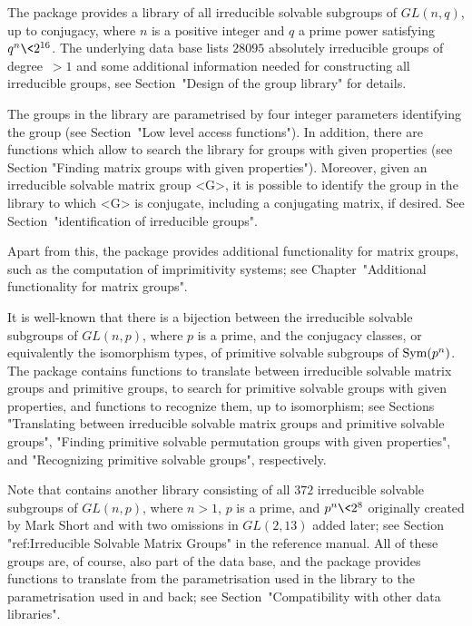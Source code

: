 
The package {\IRREDSOL} provides a library of all irreducible
solvable subgroups of $GL(n, q)$, up to conjugacy, where $n$ is a positive integer and $q$
a prime power satisfying  $q^n \< 2^{16}$. The underlying data base lists 
$28095$ absolutely irreducible groups of degree~$> 1$ and some additional information
needed for constructing all irreducible groups, see Section~"Design of the group library"
for details.

The groups in the {\IRREDSOL} 
library are parametrised by four integer parameters identifying
the group (see Section~"Low
level access functions"). In addition, there are functions which allow to 
search the library for groups with given properties (see Section "Finding
matrix groups with given properties"). Moreover, given an irreducible solvable matrix group
<G>, it is possible to identify the group in the library to which <G> is conjugate,
including a conjugating matrix, if desired. See Section~"identification of irreducible
groups".

Apart from this, the {\IRREDSOL} package provides additional functionality
for matrix groups, such as the computation of imprimitivity systems;
see Chapter~"Additional functionality for matrix groups".

It is well-known that there is a bijection between the  irreducible solvable subgroups of
$GL(n, p)$, where
$p$ is a prime, and the conjugacy classes, or equivalently the isomorphism types, of
primitive solvable subgroups of ${\rm Sym}(p^n)$. The {\IRREDSOL} package contains
functions to translate between irreducible solvable matrix groups and primitive
groups, to search for primitive solvable groups with given  properties, and functions to
recognize them, up to isomorphism;  see Sections "Translating between irreducible solvable
matrix groups and primitive solvable groups", "Finding primitive solvable permutation
groups with given properties", and "Recognizing primitive solvable groups", respectively.

Note that {\GAP} contains another library consisting of all $372$ irreducible solvable
subgroups of $GL(n, p)$, where $n > 1$, $p$ is a prime, and $p^n \< 2^8$ originally
created by Mark Short and with two omissions in $GL(2,13)$ added later; 
see Section "ref:Irreducible Solvable Matrix Groups" in the {\GAP} reference manual. 
All of these groups are,  of course, also part of the {\IRREDSOL} data base, and the
{\IRREDSOL} package provides functions to translate from the parametrisation used in the
{\GAP} library to the parametrisation used in {\IRREDSOL} and back; see
Section~"Compatibility with other data libraries".

